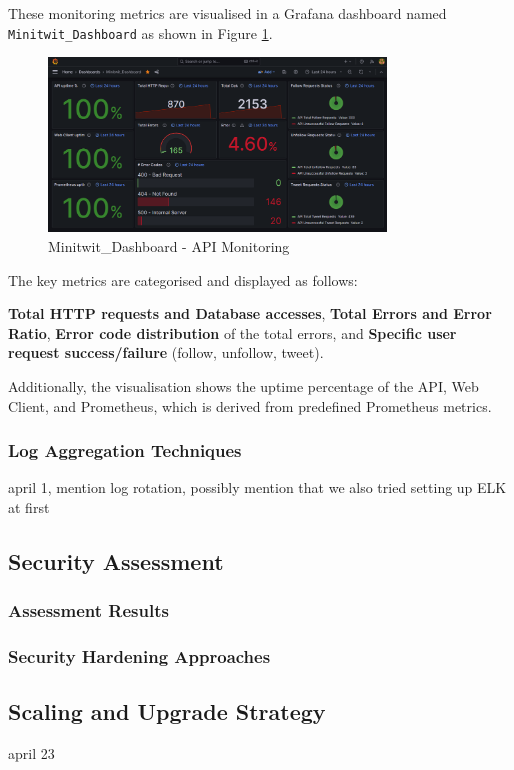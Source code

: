 These monitoring metrics are visualised in a Grafana dashboard named \texttt{Minitwit\_Dashboard} as shown in Figure \ref{fig:monitor_good}. 

\begin{figure}[H]
    \centering
    \includegraphics[width=0.8\textwidth]{images/monitor_good.png}
    \caption{Minitwit\_Dashboard - API Monitoring}
    \label{fig:monitor_good}
\end{figure}
The key metrics are categorised and displayed as follows:

\textbf{Total HTTP requests and Database accesses}, \textbf{Total Errors and Error Ratio}, \textbf{Error code distribution} of the total errors, and \textbf{Specific user request success/failure} (follow, unfollow, tweet). 

Additionally, the visualisation shows the uptime percentage of the API, Web Client, and Prometheus, which is derived from predefined Prometheus metrics.

\subsubsection*{Log Aggregation Techniques}
april 1, mention log rotation, possibly mention that we also tried setting up ELK at first
\subsection{Security Assessment}
\subsubsection*{Assessment Results}
\subsubsection*{Security Hardening Approaches}
\subsection{Scaling and Upgrade Strategy}
april 23
